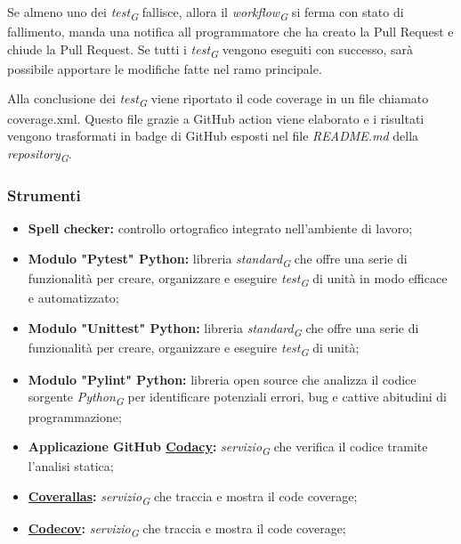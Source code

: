 Se almeno uno dei \textit{test}\textsubscript{\textit{G}} fallisce, allora il \textit{workflow}\textsubscript{\textit{G}} si ferma con stato di fallimento, manda una notifica all programmatore che ha creato la Pull Request e chiude la Pull Request. Se tutti i \textit{test}\textsubscript{\textit{G}} vengono eseguiti con successo, sarà possibile apportare le modifiche fatte nel ramo principale.

\vspace{0.2cm}

Alla conclusione dei \textit{test}\textsubscript{\textit{G}} viene riportato il code coverage in un file chiamato coverage.xml. Questo file grazie a GitHub action viene elaborato e i risultati vengono trasformati in badge di GitHub esposti nel file \textit{README.md} della \textit{repository}\textsubscript{\textit{G}}.

\hypertarget{subsubsec:strumentiVerifica}{\subsubsection{Strumenti}}
\begin{itemize}
    \item \textbf{Spell checker:} 
        controllo ortografico integrato nell’ambiente di lavoro;
    \item \textbf{Modulo "Pytest" Python:} libreria \textit{standard}\textsubscript{\textit{G}} che offre una serie di funzionalità per creare, organizzare e eseguire \textit{test}\textsubscript{\textit{G}} di unità in modo efficace e automatizzato;
    \item \textbf{Modulo "Unittest" Python:} libreria \textit{standard}\textsubscript{\textit{G}} che offre una serie di funzionalità per creare, organizzare e eseguire \textit{test}\textsubscript{\textit{G}} di unità;
    \item \textbf{Modulo "Pylint" Python:} libreria open source che analizza il codice sorgente \textit{Python}\textsubscript{\textit{G}} per identificare potenziali errori, bug e cattive abitudini di programmazione;
    \item \textbf{Applicazione GitHub \href{https://github.com/marketplace/codacy}{Codacy}:} \textit{servizio}\textsubscript{\textit{G}} che verifica il codice tramite l'analisi statica;
    \item \textbf{\href{https://github.com/marketplace/actions/coveralls-github-action}{Coverallas}:} \textit{servizio}\textsubscript{\textit{G}} che traccia e mostra il code coverage;
    \item \textbf{\href{https://github.com/marketplace/actions/codecov}{Codecov}:} \textit{servizio}\textsubscript{\textit{G}} che traccia e mostra il code coverage;
\end{itemize}
